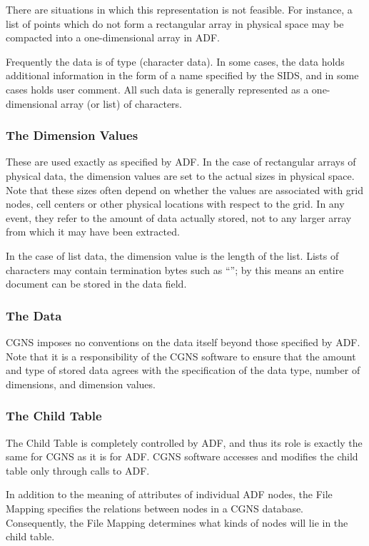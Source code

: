 There are situations in which this representation is not feasible. For
instance, a list of points which do not form a rectangular array in
physical space may be compacted into a one-dimensional array in ADF.

Frequently the data is of type  (character data). In some
cases, the data holds additional information in the form of a name
specified by the SIDS, and in some cases holds user comment. All such
data is generally represented as a one-dimensional array (or list) of
characters.

\subsubsection{The Dimension Values}

These are used exactly as specified by ADF. In the case of rectangular
arrays of physical data, the dimension values are set to the actual
sizes in physical space. Note that these sizes often depend on whether
the values are associated with grid nodes, cell centers or other
physical locations with respect to the grid. In any event, they refer to
the amount of data actually stored, not to any larger array from which
it may have been extracted.

In the case of list data, the dimension value is the length of the
list. Lists of characters may contain termination bytes such as
``''; by this means an entire document can be
stored in the data field.

\subsubsection{The Data}

CGNS imposes no conventions on the data itself beyond those specified
by ADF. Note that it is a responsibility of the CGNS software to ensure
that the amount and type of stored data agrees with the specification of
the data type, number of dimensions, and dimension values.

\subsubsection{The Child Table}
\label{s:childtable}

The Child Table is completely controlled by ADF, and thus its role is
exactly the same for CGNS as it is for ADF. CGNS software accesses and
modifies the child table only through calls to ADF.

In addition to the meaning of attributes of individual ADF nodes,
the File Mapping specifies the relations between nodes in a CGNS
database. Consequently, the File Mapping determines what kinds of nodes
will lie in the child table.

